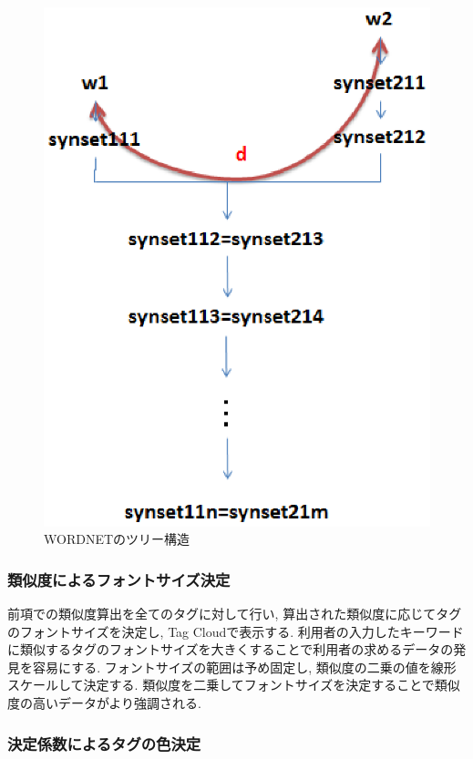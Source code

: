 \documentclass[sotsuron]{kuee}
\begin{document}
\begin{figure}
  \begin{center}
    \unitlength=1mm
   \includegraphics[width=120mm]{fig4-8.eps}
  \end{center}
  \caption{WORDNETのツリー構造}
  \label{4-8}
\end{figure}

\subsubsection{類似度によるフォントサイズ決定}

前項での類似度算出を全てのタグに対して行い, 算出された類似度に応じてタグのフォントサイズを決定し, Tag Cloudで表示する.
利用者の入力したキーワードに類似するタグのフォントサイズを大きくすることで利用者の求めるデータの発見を容易にする.
フォントサイズの範囲は予め固定し, 類似度の二乗の値を線形スケールして決定する.
類似度を二乗してフォントサイズを決定することで類似度の高いデータがより強調される.

\subsubsection{決定係数によるタグの色決定}
\end{document}
